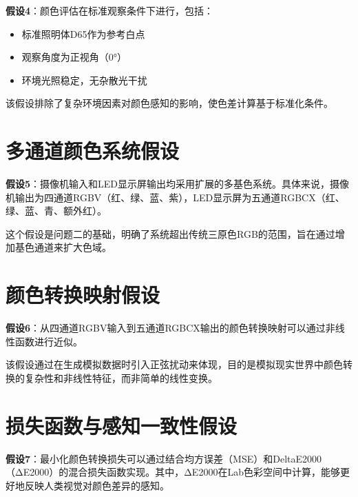 \textbf{假设4}：颜色评估在标准观察条件下进行，包括：
\begin{itemize}
    \item 标准照明体D65作为参考白点
    \item 观察角度为正视角（0°）
    \item 环境光照稳定，无杂散光干扰
\end{itemize}

该假设排除了复杂环境因素对颜色感知的影响，使色差计算基于标准化条件。

\section[\hspace{-2pt}多通道颜色系统假设]{{\heiti{} \hspace{-8pt}多通道颜色系统假设}}\label{section: 多通道颜色系统假设}

\textbf{假设5}：摄像机输入和LED显示屏输出均采用扩展的多基色系统。具体来说，摄像机输出为四通道RGBV（红、绿、蓝、紫），LED显示屏为五通道RGBCX（红、绿、蓝、青、额外红）。

这个假设是问题二的基础，明确了系统超出传统三原色RGB的范围，旨在通过增加基色通道来扩大色域。

\section[\hspace{-2pt}颜色转换映射假设]{{\heiti{} \hspace{-8pt}颜色转换映射假设}}\label{section: 颜色转换映射假设}

\textbf{假设6}：从四通道RGBV输入到五通道RGBCX输出的颜色转换映射可以通过非线性函数进行近似。

该假设通过在生成模拟数据时引入正弦扰动来体现，目的是模拟现实世界中颜色转换的复杂性和非线性特征，而非简单的线性变换。

\section[\hspace{-2pt}损失函数与感知一致性假设]{{\heiti{} \hspace{-8pt}损失函数与感知一致性假设}}\label{section: 损失函数与感知一致性假设}

\textbf{假设7}：最小化颜色转换损失可以通过结合均方误差（MSE）和DeltaE2000（ΔE2000）的混合损失函数实现。其中，ΔE2000在Lab色彩空间中计算，能够更好地反映人类视觉对颜色差异的感知。

